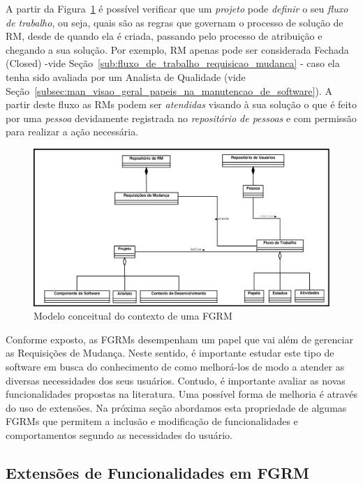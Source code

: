 A partir da Figura~\ref{fig:diagrama-classe-conceitual-fgrm} é possível
verificar que um \textit{projeto} pode \textit{definir} o seu \textit{fluxo de
    trabalho}, ou seja, quais são as regras que governam o processo de solução
de RM, desde de quando ela é criada, passando pelo processo de atribuição e
chegando a sua solução. Por exemplo, RM apenas pode ser considerada Fechada
(Closed) \@-\@ vide Seção~\ref{sub:fluxo_de_trabalho_requisicao_mudanca} \@-\@
caso ela tenha sido avaliada por um Analista de Qualidade (vide
Seção~\ref{subsec:man_visao_geral_papeis_na_manutencao_de_software}). A partir
deste fluxo as RMs podem ser \textit{atendidas} visando à sua solução o que é
feito por uma \textit{pessoa} devidamente registrada no \textit{repositório de
    pessoas} e com permissão para realizar a ação necessária.

\begin{figure}[htpb] \centering
	\includegraphics[width=1.15\linewidth]{./chapter-manutencao-software-visao-geral/img/diagrama-classe-conceitual-fgrm.pdf}
	\caption{Modelo conceitual do contexto de uma FGRM}
\label{fig:diagrama-classe-conceitual-fgrm}
\end{figure}

Conforme exposto, as FGRMs desempenham um papel que vai além de gerenciar as
Requisições de Mudança. Neste sentido, é importante estudar este tipo de
software em busca do conhecimento de como melhorá-los de modo a atender as
diversas necessidades dos seus usuários. Contudo, é importante avaliar as novas
funcionalidades propostas na li\-te\-ra\-tu\-ra. Uma possível forma de melhoria
é através do uso de extensões. Na próxima seção abordamos esta propriedade de
algumas FGRMs que permitem a inclusão e modificação de funcionalidades e
comportamentos segundo as necessidades do usuário.

\subsection{Extensões de Funcionalidades em FGRM}
\label{subsec:manutencao_visao_geral_extensoes_fgrm}

